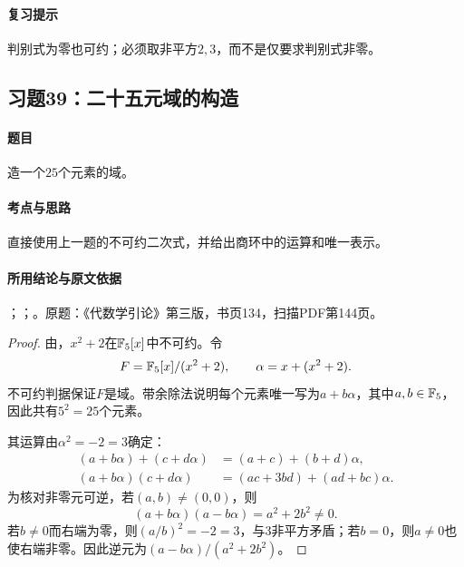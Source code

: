 \paragraph{复习提示}

判别式为零也可约；必须取非平方$2,3$，而不是仅要求判别式非零。



\subsection{习题39：二十五元域的构造}

\label{ex:3:39}

\paragraph{题目}

造一个$25$个元素的域。

\paragraph{考点与思路}

直接使用上一题的不可约二次式，并给出商环中的运算和唯一表示。

\paragraph{所用结论与原文依据}

；；。原题：《代数学引论》第三版，书页134，扫描PDF第144页。


\begin{proof}

由，$x^2+2$在$\mathbb F_5[x]$中不可约。令
\[
F=\mathbb F_5[x]/(x^2+2),\qquad \alpha=x+(x^2+2).
\]
不可约判据保证$F$是域。带余除法说明每个元素唯一写为$a+b\alpha$，其中$a,b\in\mathbb F_5$，因此共有$5^2=25$个元素。

其运算由$\alpha^2=-2=3$确定：
\begin{align*}
(a+b\alpha)+(c+d\alpha)&=(a+c)+(b+d)\alpha,\\
(a+b\alpha)(c+d\alpha)&=(ac+3bd)+(ad+bc)\alpha.
\end{align*}
为核对非零元可逆，若$(a,b)\ne(0,0)$，则
\[
(a+b\alpha)(a-b\alpha)=a^2+2b^2\ne0.
\]
若$b\ne0$而右端为零，则$(a/b)^2=-2=3$，与$3$非平方矛盾；若$b=0$，则$a\ne0$也使右端非零。因此逆元为$(a-b\alpha)/(a^2+2b^2)$。

\end{proof}

